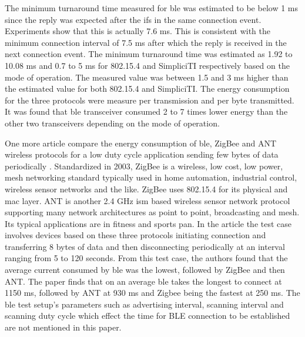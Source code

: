 The minimum turnaround time measured for \gls{ble} was estimated to be below 1 ms since the reply was expected after the \gls{ifs} in the same connection event. Experiments show that this is actually 7.6 ms. This is consistent with the minimum connection interval of 7.5 ms after which the reply is received in the next connection event. The minimum turnaround time was estimated as 1.92 to 10.08 ms and 0.7 to 5 ms for 802.15.4 and SimpliciTI respectively based on the mode of operation. The measured value was between 1.5 and 3 ms higher than the estimated value for both 802.15.4 and SimpliciTI. The energy consumption for the three protocols were measure per transmission and per byte transmitted. It was found that \gls{ble} transceiver consumed 2 to 7 times lower energy than the other two transceivers depending on the mode of operation.

One more article compare the energy consumption of \gls{ble}, ZigBee and ANT wireless protocols for a low duty cycle application sending few bytes of data periodically  \cite{Dementyev2013}. Standardized in 2003, ZigBee is a wireless, low cost, low power, mesh networking standard \cite{ZigbeeAkl} typically used in home automation, industrial control, wireless sensor networks and the like. ZigBee uses 802.15.4 for its physical and \gls{mac} layer. ANT is another 2.4 GHz \gls{ism} based wireless sensor network protocol supporting many network architectures as point to point, broadcasting and mesh. Its typical applications are in fitness and sports \gls{pan}. In the article \cite{Dementyev2013} the test case involves devices based on these three protocols initiating connection and transferring 8 bytes of data and then disconnecting periodically at an interval ranging from 5 to 120 seconds. From this test case, the authors found that the average current consumed by \gls{ble} was the lowest, followed by ZigBee and then ANT. The paper finds that on an average \gls{ble} takes the longest to connect at 1150 ms, followed by ANT at 930 ms and Zigbee being the fastest at 250 ms. The \gls{ble} test setup's parameters such as advertising interval, scanning interval and scanning duty cycle which effect the time for BLE connection to be established are not mentioned in this paper.

